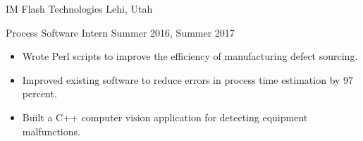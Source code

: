 \blockskip

\begin{tab1} IM Flash Technologies \> Lehi, Utah \end{tab1}
\begin{tab2} Process Software Intern \> Summer 2016, Summer 2017 \end{tab2}
\begin{itemize}
    \item Wrote Perl scripts to improve the efficiency of manufacturing defect sourcing.
    \item Improved existing software to reduce errors in process time estimation by 97 percent.
    \item Built a C++ computer vision application for detecting equipment malfunctions.
\end{itemize}

